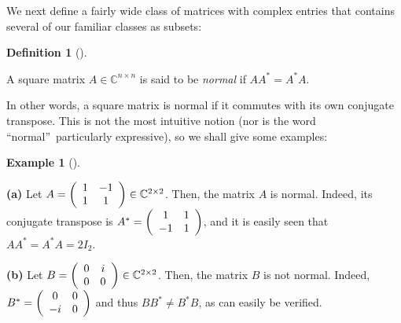 \documentclass[numbers=enddot,12pt,final,onecolumn,notitlepage]{scrartcl}%
\numberwithin{exer}{subsection}
\theoremstyle{definition}
\newtheorem{defi}[theo]{Definition}
\newenvironment{definition}[1][]
{\begin{defi}[#1]\begin{leftbar}}
{\end{leftbar}\end{defi}}
\newtheorem{exam}[theo]{Example}
\newenvironment{example}[1][]
{\begin{exam}[#1]\begin{leftbar}}
{\end{leftbar}\end{exam}}
\begin{document}
We next define a fairly wide class of matrices with complex entries that
contains several of our familiar classes as subsets:

\begin{definition}
\label{def.schurtri.normal.normal}A square matrix $A\in\mathbb{C}^{n\times n}$
is said to be \emph{normal} if $AA^{\ast}=A^{\ast}A$.
\end{definition}

In other words, a square matrix is normal if it commutes with its own
conjugate transpose. This is not the most intuitive notion (nor is the word
\textquotedblleft normal\textquotedblright\ particularly expressive), so we
shall give some examples:

\begin{example}
\textbf{(a)} Let $A=\left(
\begin{array}
[c]{cc}%
1 & -1\\
1 & 1
\end{array}
\right)  \in\mathbb{C}^{2\times2}$. Then, the matrix $A$ is normal. Indeed,
its conjugate transpose is $A^{\ast}=\left(
\begin{array}
[c]{cc}%
1 & 1\\
-1 & 1
\end{array}
\right)  $, and it is easily seen that $AA^{\ast}=A^{\ast}A=2I_{2}$. \medskip

\textbf{(b)} Let $B=\left(
\begin{array}
[c]{cc}%
0 & i\\
0 & 0
\end{array}
\right)  \in\mathbb{C}^{2\times2}$. Then, the matrix $B$ is not normal.
Indeed, $B^{\ast}=\left(
\begin{array}
[c]{cc}%
0 & 0\\
-i & 0
\end{array}
\right)  $ and thus $BB^{\ast}\neq B^{\ast}B$, as can easily be verified.
\medskip


\end{example}
\end{document}

